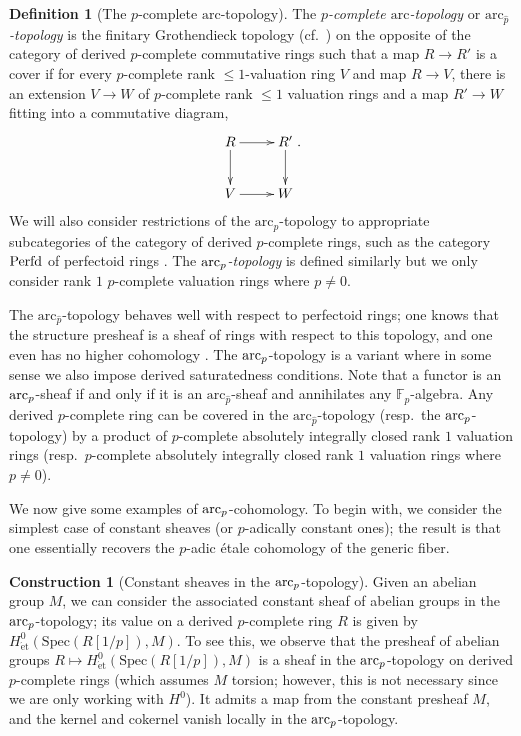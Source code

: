 \documentclass{amsart}
\newcommand{\et}{\mathrm{\acute{e}t}}
\theoremstyle{definition}
\newtheorem{construction}[theorem]{Construction}
\newcommand{\spec}{\mathrm{Spec}}
\newtheorem{definition}[theorem]{Definition}
\begin{document}
\newcommand{\arcph}{\mathrm{arc}_{\hat{p}}}
\begin{definition}[The {$p$-complete $\mathrm{arc}$-topology}] 
The \emph{$p$-complete $\mathrm{arc}$-topology} or  \emph{$\arcph$-topology}
is the finitary Grothendieck topology (cf.~) on the opposite of the category of derived $p$-complete
commutative rings 
such that a map $R \to R'$ is a cover if for every $p$-complete rank $\leq
1$-valuation ring $V$ and map $R \to V$, there is an extension $V \to W$ of
$p$-complete rank $\leq 1$ valuation rings and a map $R' \to W$ fitting into a
commutative diagram,
\[ \xymatrix{
R \ar[d]  \ar[r] &  R' \ar[d]  \\
V \ar[r] &  W 
}.\]
We will also consider restrictions of the $\arcph$-topology to 
appropriate subcategories of the category of derived $p$-complete rings, such as the category 
$\mathrm{Perfd}$ of perfectoid rings \cite[Sec.~3]{BMS1}.  
The \emph{$\mathrm{arc}_{{p}}$-topology} is defined similarly but we only consider rank $1$
$p$-complete valuation rings where $p \neq 0$. 
\end{definition} 

The $\arcph$-topology behaves well with respect to perfectoid rings; one knows
that 
the structure presheaf is a sheaf of rings with respect to this topology, and one even
has no higher cohomology \cite[Sec.~8]{Prisms}. 
The $\mathrm{arc}_{{p}}$-topology is a variant where in some sense we also impose derived
saturatedness conditions. 
Note that a functor is an $\mathrm{arc}_{{p}}$-sheaf if and only if it is an $\arcph$-sheaf
and annihilates any $\mathbb{F}_p$-algebra. 
Any derived $p$-complete ring can be covered in the $\arcph$-topology
(resp.~the $\mathrm{arc}_{{p}}$-topology) by a product of $p$-complete absolutely integrally
closed rank $1$ valuation rings (resp.~$p$-complete absolutely integrally
closed rank $1$ valuation rings where $p \neq 0$). 

We now give some examples of $\mathrm{arc}_{{p}}$-cohomology. To begin with, we consider the
simplest case of constant sheaves (or $p$-adically constant ones); the result is
that one essentially recovers the $p$-adic \'etale cohomology of the generic
fiber. 

\begin{construction}[Constant sheaves in the $\mathrm{arc}_{{p}}$-topology] 
Given an abelian group $M$, 
we can consider the associated constant sheaf of abelian groups in the
$\mathrm{arc}_{{p}}$-topology; its value on a derived $p$-complete ring $R$ is given by  $ H^0_{\et}( \spec(R[1/p]), M)$. 
To see this, we observe that the presheaf of abelian groups $R \mapsto 
 H^0_{\et}( \spec(R[1/p]), M)$ is a sheaf in the $\mathrm{arc}_{{p}}$-topology on derived
 $p$-complete rings 
\cite[Cor.~6.17]{BM18} (which assumes $M$ torsion; however, this is not
necessary since we are only working with $H^0$). 
It admits a map from the constant presheaf $M$, and the kernel and cokernel
vanish locally in the $\mathrm{arc}_{{p}}$-topology. 
\end{construction} 
\end{document}
